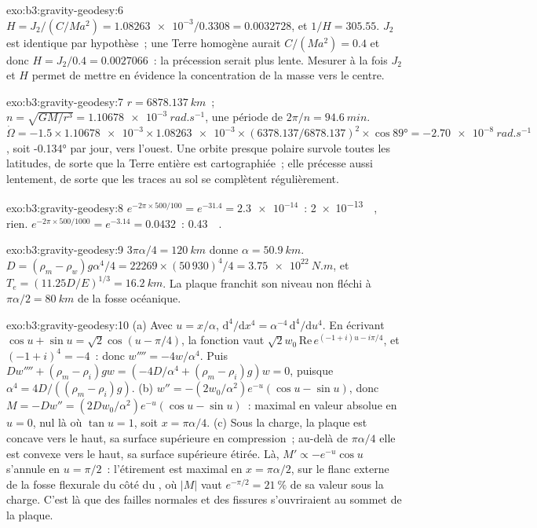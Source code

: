 \begin{solution}{exo:b3:gravity-geodesy:6}
$H = J_2/(C/Ma^2) = \num{1.08263e-3}/0.3308 = \num{0.0032728}$, et
$1/H = 305.55$. $J_2$ est identique par hypothèse~; une Terre homogène aurait
$C/(Ma^2) = 0.4$ et donc $H = J_2/0.4 = \num{0.0027066}$~: la précession serait
plus lente. Mesurer à la fois $J_2$ et $H$ permet de mettre en évidence la
concentration de la masse vers le centre.
\end{solution}

\begin{solution}{exo:b3:gravity-geodesy:7}
$r = \qty{6878.137}{km}$~; $n = \sqrt{GM/r^3} = \qty{1.10678e-3}{rad.s^{-1}}$, une
période de $2\pi/n = \qty{94.6}{min}$. $\dot\Omega = -1.5\times\num{1.10678e-3}
\times\num{1.08263e-3}\times(6378.137/6878.137)^2\times\cos\ang{89} =
\qty{-2.70e-8}{rad.s^{-1}}$, soit \ang{-0.134} par jour, vers l'ouest. Une orbite presque polaire
survole toutes les latitudes, de sorte que la Terre entière est cartographiée~; elle précesse aussi
lentement, de sorte que les traces au sol se complètent régulièrement.
\end{solution}

\begin{solution}{exo:b3:gravity-geodesy:8}
$e^{-2\pi\times500/100} = e^{-31.4} = \num{2.3e-14}$~: \qty{2e-13}{\milli\gal},
rien. $e^{-2\pi\times500/1000} = e^{-3.14} = 0.0432$~:
\qty{0.43}{\milli\gal}.
\end{solution}

\begin{solution}{exo:b3:gravity-geodesy:9}
$3\pi\alpha/4 = \qty{120}{km}$ donne $\alpha = \qty{50.9}{km}$.
$D = (\rho_m - \rho_w)g\alpha^4/4 = 22269\times(50\,930)^4/4 =
\qty{3.75e22}{N.m}$, et $T_e = (11.25D/E)^{1/3} = \qty{16.2}{km}$. La plaque
franchit son niveau non fléchi à $\pi\alpha/2 = \qty{80}{km}$ de la fosse océanique.
\end{solution}

\begin{solution}{exo:b3:gravity-geodesy:10}
(a) Avec $u = x/\alpha$, $\mathrm d^4/\mathrm dx^4 = \alpha^{-4}\,\mathrm
d^4/\mathrm du^4$. En écrivant $\cos u + \sin u = \sqrt2\cos(u - \pi/4)$, la
fonction vaut $\sqrt2w_0\,\mathrm{Re}\,e^{(-1 + i)u - i\pi/4}$, et
$(-1 + i)^4 = -4$~: donc $w'''' = -4w/\alpha^4$. Puis $Dw'''' + (\rho_m -
\rho_i)gw = (-4D/\alpha^4 + (\rho_m - \rho_i)g)w = 0$, puisque $\alpha^4 =
4D/((\rho_m - \rho_i)g)$. (b) $w'' = -(2w_0/\alpha^2)e^{-u}(\cos u - \sin u)$, donc
$M = -Dw'' = (2Dw_0/\alpha^2)e^{-u}(\cos u - \sin u)$~: maximal en valeur absolue en
$u = 0$, nul là où $\tan u = 1$, soit $x = \pi\alpha/4$. (c) Sous la charge, la
plaque est concave vers le haut, sa surface supérieure en compression~; au-delà de $\pi\alpha/4$
elle est convexe vers le haut, sa surface supérieure étirée. Là, $M' \propto
-e^{-u}\cos u$ s'annule en $u = \pi/2$~: l'étirement est maximal en
$x = \pi\alpha/2$, sur le flanc externe de la fosse flexurale du côté du , où
$|M|$ vaut $e^{-\pi/2} = \qty{21}{\percent}$ de sa valeur sous la charge. C'est
là que des failles normales et des fissures s'ouvriraient au sommet de la plaque.
\end{solution}

